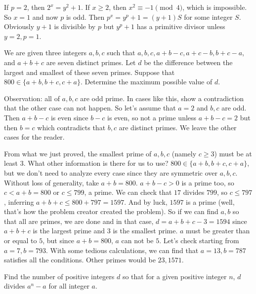 \documentclass[problems.tex]{subfile}
\begin{document}
	\begin{solution}
		If $p=2$, then $2^x=y^2+1$. If $x\geq2$, then $x^2\equiv-1\pmod4$, which is impossible. So $x=1$ and now $p$ is odd. Then $p^x=y^p+1=(y+1)S$ for some integer $S$. Obviously $y+1$ is divisible by $p$ but $y^p+1$ has a primitive divisor unless $y=2,p=1$. 
	\end{solution}
	
	\begin{problem}
		We are given three integers $a, b, c$ such that $a, b, c, a + b - c, a + c - b, b + c - a$, and $a + b + c$ are seven distinct primes. Let $d$ be the difference between the largest and smallest of these seven primes. Suppose that $800\in \{a+b, b+c, c+a\}$. Determine the maximum possible value of $d$.
	\end{problem}
	
	\begin{solution}
		Observation: all of $a,b,c$ are odd prime. In cases like this, show a contradiction that the other case can not happen. So let's assume that $a=2$ and $b,c$ are odd. Then $a+b-c$ is even since $b-c$ is even, so not a prime unless $a+b-c=2$ but then $b=c$ which contradicts that $b,c$ are distinct primes. We leave the other cases for the reader.
		
		From what we just proved, the smallest prime of $a,b,c$ (namely $c\geq3$) must be at least $3$. What other information is there for us to use? $800\in \{a+b, b+c, c+a\}$, but we don't need to analyze every case since they are symmetric over $a,b,c$. Without loss of generality, take $a+b=800$. $a+b-c>0$ is a prime too, so $c<a+b=800$ or $c\leq 799$, a prime. We can check that $17$ divides $799$, so $c\leq797$, inferring $a+b+c\leq800+797=1597$. And by luck, $1597$ is a prime (well, that's how the problem creator created the problem). So if we can find $a,b$ so that all are primes, we are done and in that case, $d=a+b+c-3=1594$ since $a+b+c$ is the largest prime and $3$ is the smallest prime. $a$ must be greater than or equal to $5$, but since $a+b=800$, $a$ can not be $5$. Let's check starting from $a=7,b=793$. With some tedious calculations, we can find that $a=13,b=787$ satisfies all the conditions. Other primes would be $23,1571$.
	\end{solution}
	
	\begin{problem}
		Find the number of positive integers $d$ so that for a given positive integer $n$, $d$ divides $a^n-a$ for all integer $a$.
	\end{problem}
	
\end{document}

